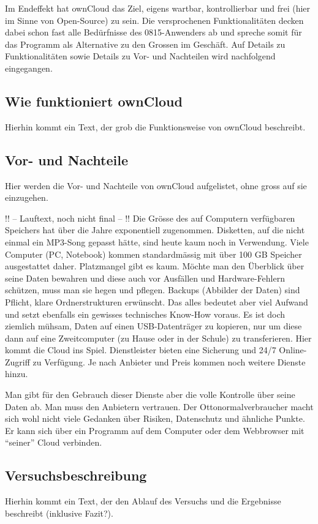 Im Endeffekt hat ownCloud das Ziel, eigens wartbar, kontrollierbar und frei (hier im Sinne von Open-Source) zu sein. Die versprochenen Funktionalitäten decken dabei schon fast alle Bedürfnisse des 0815-Anwenders ab und spreche somit für das Programm als Alternative zu den Grossen im Geschäft. Auf Details zu Funktionalitäten sowie Details zu Vor- und Nachteilen wird nachfolgend eingegangen.

\subsection{Wie funktioniert ownCloud}
Hierhin kommt ein Text, der grob die Funktionsweise von ownCloud beschreibt.

\subsection{Vor- und Nachteile}
Hier werden die Vor- und Nachteile von ownCloud aufgelistet, ohne gross auf sie einzugehen.

!! -- Lauftext, noch nicht final -- !!
Die Grösse des auf Computern verfügbaren Speichers hat über die Jahre exponentiell zugenommen. Disketten, auf die nicht einmal ein MP3-Song gepasst hätte, sind heute kaum noch in Verwendung. Viele Computer (PC, Notebook) kommen standardmässig mit über 100 GB Speicher ausgestattet daher. Platzmangel gibt es kaum. Möchte man den Überblick über seine Daten bewahren und diese auch vor Ausfällen und Hardware-Fehlern schützen, muss man sie hegen und pflegen. Backups (Abbilder der Daten) sind Pflicht, klare Ordnerstrukturen erwünscht. Das alles bedeutet aber viel Aufwand und setzt ebenfalls ein gewisses technisches Know-How voraus. Es ist doch ziemlich mühsam, Daten auf einen USB-Datenträger zu kopieren, nur um diese dann auf eine Zweitcomputer (zu Hause oder in der Schule) zu transferieren. Hier kommt die Cloud ins Spiel. Dienstleister bieten eine Sicherung und 24/7 Online-Zugriff zu Verfügung. Je nach Anbieter und Preis kommen noch weitere Dienste hinzu. 

Man gibt für den Gebrauch dieser Dienste aber die volle Kontrolle über seine Daten ab. Man muss den Anbietern vertrauen. Der Ottonormalverbraucher macht sich wohl nicht viele Gedanken über Risiken, Datenschutz und ähnliche Punkte. Er kann sich über ein Programm auf dem Computer oder dem Webbrowser mit ``seiner'' Cloud verbinden.

\subsection{Versuchsbeschreibung}
Hierhin kommt ein Text, der den Ablauf des Versuchs und die Ergebnisse beschreibt (inklusive Fazit?).


